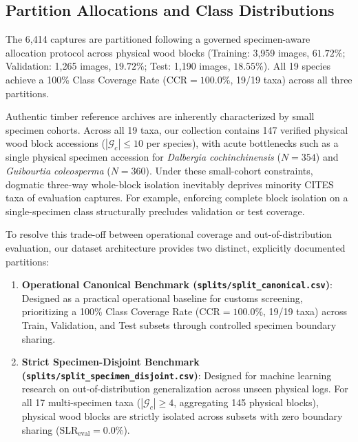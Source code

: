 \documentclass[a4paper,fleqn,12pt]{cas-sc}
\begin{document}
\subsection{Partition Allocations and Class Distributions}

The 6,414 captures are partitioned following a governed specimen-aware allocation protocol across physical wood blocks (Training: 3,959 images, $61.72\%$; Validation: 1,265 images, $19.72\%$; Test: 1,190 images, $18.55\%$). All 19 species achieve a 100\% Class Coverage Rate ($\text{CCR} = 100.0\%$, 19/19 taxa) across all three partitions.

Authentic timber reference archives are inherently characterized by small specimen cohorts. Across all 19 taxa, our collection contains 147 verified physical wood block accessions ($|\mathcal{G}_c| \le 10$ per species), with acute bottlenecks such as a single physical specimen accession for \textit{Dalbergia cochinchinensis} ($N=354$) and \textit{Guibourtia coleosperma} ($N=360$). Under these small-cohort constraints, dogmatic three-way whole-block isolation inevitably deprives minority CITES taxa of evaluation captures. For example, enforcing complete block isolation on a single-specimen class structurally precludes validation or test coverage.

To resolve this trade-off between operational coverage and out-of-distribution evaluation, our dataset architecture provides two distinct, explicitly documented partitions:
\begin{enumerate}[leftmargin=*,itemsep=2.5pt,topsep=2pt]
    \item \textbf{Operational Canonical Benchmark (\texttt{splits/split\_canonical.csv})}: Designed as a practical operational baseline for customs screening, prioritizing a 100\% Class Coverage Rate ($\text{CCR} = 100.0\%$, 19/19 taxa) across Train, Validation, and Test subsets through controlled specimen boundary sharing.
    \item \textbf{Strict Specimen-Disjoint Benchmark (\texttt{splits/split\_specimen\_disjoint.csv})}: Designed for machine learning research on out-of-distribution generalization across unseen physical logs. For all 17 multi-specimen taxa ($|\mathcal{G}_c| \ge 4$, aggregating 145 physical blocks), physical wood blocks are strictly isolated across subsets with zero boundary sharing ($\text{SLR}_{\text{eval}} = 0.0\%$).
\end{enumerate}
\end{document}
